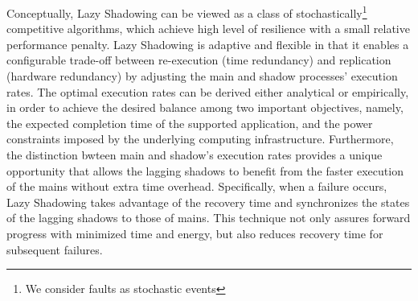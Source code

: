 Conceptually, Lazy Shadowing can be viewed as a class of stochastically\footnote{We consider faults as stochastic events} competitive algorithms, which 
achieve high level of resilience with a small relative performance penalty.
Lazy Shadowing is adaptive and flexible in that it enables a configurable trade-off between re-execution (time redundancy) and replication (hardware redundancy) by adjusting the main and shadow processes' execution rates.
The optimal execution rates can be derived either analytical or empirically, in order to achieve the desired balance among two important objectives, namely, the expected completion time of the supported application, and the power constraints imposed by the underlying computing infrastructure.%
Furthermore, the distinction bwteen main and shadow's execution rates provides a unique opportunity %
that allows the lagging shadows to benefit from the faster execution of the mains without extra time overhead.
Specifically, when a failure occurs, Lazy Shadowing takes advantage of the recovery time and synchronizes the states of the lagging shadows to those of mains. This technique not only assures forward progress with minimized time and energy, but also reduces recovery time for subsequent failures.  

